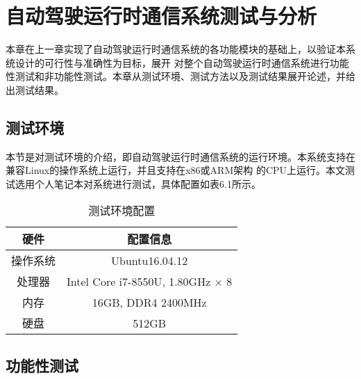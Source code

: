 \chapter{自动驾驶运行时通信系统测试与分析}
本章在上一章实现了自动驾驶运行时通信系统的各功能模块的基础上，以验证本系统设计的可行性与准确性为目标，展开
对整个自动驾驶运行时通信系统进行功能性测试和非功能性测试。本章从测试环境、测试方法以及测试结果展开论述，并给出测试结果。

\section{测试环境}
本节是对测试环境的介绍，即自动驾驶运行时通信系统的运行环境。本系统支持在兼容Linux的操作系统上运行，并且支持在x86或ARM架构
的CPU上运行。本文测试选用个人笔记本对系统进行测试，具体配置如表6.1所示。
\begin{table}[htb]
  \centering\small
  \caption{测试环境配置}
  \label{tab:exampletable}
  \begin{tabular}{cc}
    \toprule
    硬件 & 配置信息 \\
    \midrule
    操作系统 & Ubuntu16.04.12\\
    处理器 & Intel Core i7-8550U, 1.80GHz $\times$ 8\\
    内存 & 16GB, DDR4 2400MHz\\
    硬盘 & 512GB\\
    \bottomrule
  \end{tabular}
\end{table}
    
\section{功能性测试}
